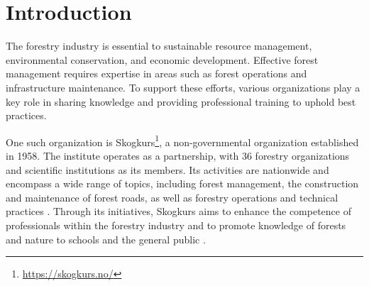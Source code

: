 \chapter{Introduction}\label{chap:introduction}

The forestry industry is essential to sustainable resource management, environmental conservation, and economic development. Effective forest management requires expertise in areas such as forest operations and infrastructure maintenance. To support these efforts, various organizations play a key role in sharing knowledge and providing professional training to uphold best practices.

One such organization is Skogkurs\footnote{\url{https://skogkurs.no/}}, a non-governmental organization established in 1958. The institute operates as a partnership, with 36 forestry organizations and scientific institutions as its members. Its activities are nationwide and encompass a wide range of topics, including forest management, the construction and maintenance of forest roads, as well as forestry operations and technical practices \cite{skogkurs_eng}. Through its initiatives, Skogkurs aims to enhance the competence of professionals within the forestry industry and to promote knowledge of forests and nature to schools and the general public \cite{skogkurs_nor}. 

